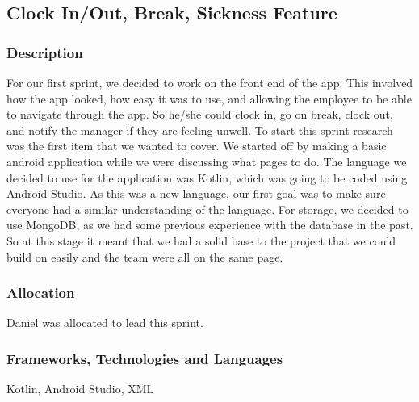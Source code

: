 \subsection{Clock In/Out, Break, Sickness Feature}
\subsubsection{Description}
For our first sprint, we decided to work on the front end of the app. This involved how the app looked, how easy it was to use, and allowing the employee to be able to navigate through the app. So he/she could clock in, go on break, clock out, and notify the manager if they are feeling unwell. To start this sprint research was the first item that we wanted to cover. We started off by making a basic android application while we were discussing what pages to do. The language we decided to use for the application was Kotlin, which was going to be coded using Android Studio. As this was a new language, our first goal was to make sure everyone had a similar understanding of the language. For storage, we decided to use MongoDB, as we had some previous experience with the database in the past. So at this stage it meant that we had a solid base to the project that we could build on easily and the team were all on the same page.
\subsubsection{Allocation}
Daniel was allocated to lead this sprint.
\subsubsection{Frameworks, Technologies and Languages}
Kotlin, Android Studio, XML
